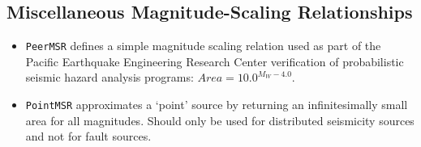 \subsection{Miscellaneous Magnitude-Scaling Relationships} 
\begin{itemize}
    \item \verb=PeerMSR= defines a simple magnitude scaling relation used as part of the Pacific Earthquake Engineering Research Center verification of probabilistic seismic hazard analysis programs: $Area = 10.0 ^{M_W - 4.0}$.
    \item \verb=PointMSR= approximates a `point' source by returning an infinitesimally small area for all magnitudes. Should only be used for distributed seismicity sources and not for fault sources. 
\end{itemize}

%
